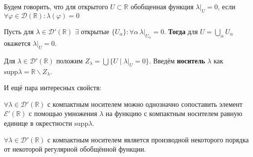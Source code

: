Будем говорить, что для открытого $U \subset \mathbb{R}$ обобщенная функция $\lambda\big|_U = 0$, если $\forall \varphi \in \mathcal{D}(\mathbb{R})\colon \lambda(\varphi) = 0$

\begin{to_lem}
	Пусть для $\lambda \in \mathcal{D}'(\mathbb{R})$ $\exists$ открытые $\{U_\alpha\} \colon \forall \alpha \, \lambda\big|_{U_\alpha} = 0$. \textbf{Тогда} для $U = \bigcup_\alpha U_\alpha$ окажется $\lambda\big|_U = 0$.
\end{to_lem}

\begin{to_def}
	Для $\lambda \in \mathcal{D}'(\mathbb{R})$ положим $Z_\lambda = \bigcup \{U \mid \lambda\big|_U = 0\}$. Введём \textbf{носитель}  $\lambda$ как $\text{supp} \lambda = \mathbb{R} \backslash Z_\lambda$.
\end{to_def}

И ещё пара интересных свойств:
\begin{to_lem}
	$\forall \lambda \in \mathcal{D}'(\mathbb{R})$ с компактным носителем можно однозначно сопоставить элемент $\mathcal{E}'(\mathbb{R})$ с помощью умножения $\lambda$ на функцию с компактным носителем равную единице в окрестности $\text{supp}\lambda$.
\end{to_lem}

\begin{to_thr}
	$\forall \lambda \in \mathcal{D}'(\mathbb{R})$ с компактным носителем является производной некоторого порядка от некоторой регулярной обобщённой функции.
\end{to_thr}